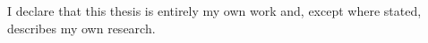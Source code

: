 I declare that this thesis is entirely my own work and, except where stated,
 describes my own research.

\bigbreak
\bigbreak

\noindent \AuthorName \par
\noindent \CollegeName \par
